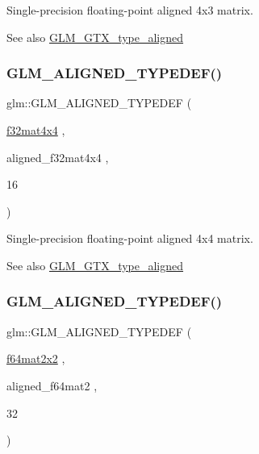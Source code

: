 Single-\/precision floating-\/point aligned 4x3 matrix. \begin{DoxySeeAlso}{See also}
\mbox{\hyperlink{group__gtx__type__aligned}{G\+L\+M\+\_\+\+G\+T\+X\+\_\+type\+\_\+aligned}} 
\end{DoxySeeAlso}
\mbox{\label{group__gtx__type__aligned_gacc429b3b0b49921e12713b6d31e14e1d}} 
\subsubsection{\texorpdfstring{GLM\_ALIGNED\_TYPEDEF()}{GLM\_ALIGNED\_TYPEDEF()}\hspace{0.1cm}{\footnotesize\ttfamily [192/209]}}
{\footnotesize\ttfamily glm\+::\+G\+L\+M\+\_\+\+A\+L\+I\+G\+N\+E\+D\+\_\+\+T\+Y\+P\+E\+D\+EF (\begin{DoxyParamCaption}\item[{\mbox{\hyperlink{group__gtc__type__precision_gac4a4b2671cbf50ab95c55fce2bfcd811}{f32mat4x4}}}]{,  }\item[{aligned\+\_\+f32mat4x4}]{,  }\item[{16}]{ }\end{DoxyParamCaption})}

Single-\/precision floating-\/point aligned 4x4 matrix. \begin{DoxySeeAlso}{See also}
\mbox{\hyperlink{group__gtx__type__aligned}{G\+L\+M\+\_\+\+G\+T\+X\+\_\+type\+\_\+aligned}} 
\end{DoxySeeAlso}
\mbox{\label{group__gtx__type__aligned_ga88f6c6fa06e6e64479763e69444669cf}} 
\subsubsection{\texorpdfstring{GLM\_ALIGNED\_TYPEDEF()}{GLM\_ALIGNED\_TYPEDEF()}\hspace{0.1cm}{\footnotesize\ttfamily [193/209]}}
{\footnotesize\ttfamily glm\+::\+G\+L\+M\+\_\+\+A\+L\+I\+G\+N\+E\+D\+\_\+\+T\+Y\+P\+E\+D\+EF (\begin{DoxyParamCaption}\item[{\mbox{\hyperlink{group__gtc__type__precision_ga1e14d8b4e18898be51cd719fda213dcc}{f64mat2x2}}}]{,  }\item[{aligned\+\_\+f64mat2}]{,  }\item[{32}]{ }\end{DoxyParamCaption})}

